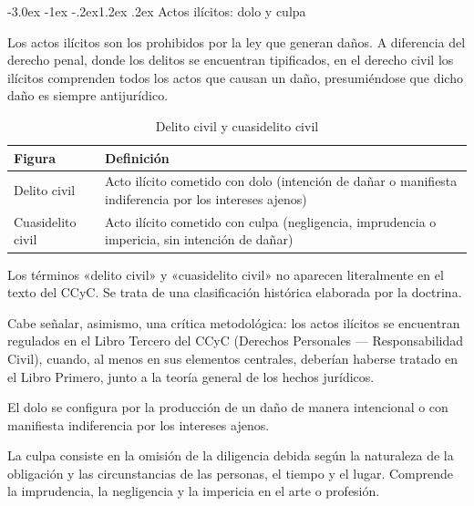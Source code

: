 \documentclass[12pt,oneside]{book}
\makeatletter
\renewcommand\section{\@startsection{section}{1}{\z@}%
  {-3.0ex \@plus -1ex \@minus -.2ex}{1.2ex \@plus .2ex}%
  {\normalfont\large\bfseries\color{acento}}}
\makeatother
\begin{document}
\section{Actos ilícitos: dolo y culpa}

Los actos ilícitos son los prohibidos por la ley que generan daños. A diferencia del derecho penal, donde los delitos se encuentran tipificados, en el derecho civil los ilícitos comprenden todos los actos que causan un daño, presumiéndose que dicho daño es siempre antijurídico.

\begin{table}[H]
\centering
\caption{Delito civil y cuasidelito civil}
\begin{tabularx}{\textwidth}{l X}
\toprule
\textbf{Figura} & \textbf{Definición} \\
\midrule
Delito civil & Acto ilícito cometido con dolo (intención de dañar o manifiesta indiferencia por los intereses ajenos) \\
Cuasidelito civil & Acto ilícito cometido con culpa (negligencia, imprudencia o impericia, sin intención de dañar) \\
\bottomrule
\end{tabularx}
\end{table}

\begin{nota}
Los términos «delito civil» y «cuasidelito civil» no aparecen literalmente en el texto del CCyC. Se trata de una clasificación histórica elaborada por la doctrina.

Cabe señalar, asimismo, una crítica metodológica: los actos ilícitos se encuentran regulados en el Libro Tercero del CCyC (Derechos Personales --- Responsabilidad Civil), cuando, al menos en sus elementos centrales, deberían haberse tratado en el Libro Primero, junto a la teoría general de los hechos jurídicos.
\end{nota}

\begin{definicion}
El dolo se configura por la producción de un daño de manera intencional o con manifiesta indiferencia por los intereses ajenos.

La culpa consiste en la omisión de la diligencia debida según la naturaleza de la obligación y las circunstancias de las personas, el tiempo y el lugar. Comprende la imprudencia, la negligencia y la impericia en el arte o profesión.
\end{definicion}
\end{document}
